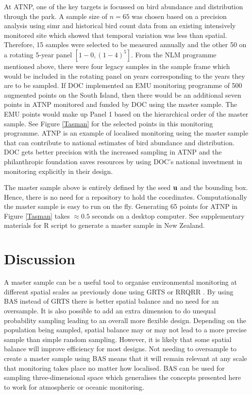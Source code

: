 \documentclass[titlepage]{article}
\begin{document}
At ATNP, one of the key targets is focussed on bird abundance and distribution through the park. A sample size of $n = 65$ was chosen based on a precision analysis using simr \citep{simr} and historical bird count data from an existing intensively monitored site which showed that temporal variation was less than spatial. Therefore, 15 samples were selected to be measured annually and the other 50 on a rotating 5-year panel $[1-0,(1-4)^5]$. From the NLM programme mentioned above, there were four legacy samples in the sample frame which would be included in the rotating panel on years corresponding to the years they are to be sampled. If DOC implemented an EMU monitoring programme of 500 augmented points on the South Island, then there would be an additional seven points in ATNP monitored and funded by DOC using the master sample. The EMU points would make up Panel 1 based on the hierarchical order of the master sample. See Figure \ref{Tasman} for the selected points in this monitoring programme. ATNP is an example of localised monitoring using the master sample that can contribute to national estimates of bird abundance and distribution. DOC gets better precision with the increased sampling in ATNP and the philanthropic foundation saves resources by using DOC's national investment in monitoring explicitly in their design.

The master sample above is entirely defined by the seed ${\bf u}$ and the bounding box. Hence, there is no need for a repository to hold the coordinates. Computationally the master sample is easy to run on the fly. Generating 65 points for ATNP in Figure \ref{Tasman} takes $\approx 0.5$ seconds on a desktop computer. See supplementary materials for R script to generate a master sample in New Zealand.

\section{Discussion}
A master sample can be a useful tool to organise environmental monitoring at different spatial scales as previously done using GRTS or RRQRR \citep{LarsenOlsenStevens2008, theobald2016}. By using BAS instead of GRTS there is better spatial balance \citep{Robertson2013} and no need for an oversample. It is also possible to add an extra dimension to do unequal probability sampling leading to an overall more flexible design. Depending on the population being sampled, spatial balance may or may not lead to a more precise sample than simple random sampling. However, it is likely that some spatial balance will improve efficiency for most designs. Not needing to oversample to create a master sample using BAS means that it will remain relevant at any scale that monitoring takes place no matter how localised. BAS can be used for sampling three-dimensional space \citep{Robertson2013} which generalises the concepts presented here to work for atmospheric or oceanic monitoring. 
\end{document}
